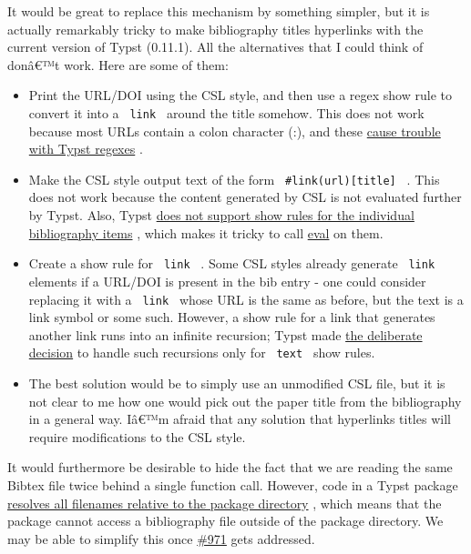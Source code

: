 It would be great to replace this mechanism by something simpler, but it
is actually remarkably tricky to make bibliography titles hyperlinks
with the current version of Typst (0.11.1). All the alternatives that I
could think of donâ€™t work. Here are some of them:

\begin{itemize}
\tightlist
\item
  Print the URL/DOI using the CSL style, and then use a regex show rule
  to convert it into a \texttt{\ link\ } around the title somehow. This
  does not work because most URLs contain a colon character (:), and
  these \href{https://github.com/typst/typst/issues/86}{cause trouble
  with Typst regexes} .
\item
  Make the CSL style output text of the form
  \texttt{\ \#link(url){[}title{]}\ } . This does not work because the
  content generated by CSL is not evaluated further by Typst. Also,
  Typst \href{https://github.com/typst/typst/issues/942}{does not
  support show rules for the individual bibliography items} , which
  makes it tricky to call
  \href{https://typst.app/docs/reference/foundations/eval/}{eval} on
  them.
\item
  Create a show rule for \texttt{\ link\ } . Some CSL styles already
  generate \texttt{\ link\ } elements if a URL/DOI is present in the bib
  entry - one could consider replacing it with a \texttt{\ link\ } whose
  URL is the same as before, but the text is a link symbol or some such.
  However, a show rule for a link that generates another link runs into
  an infinite recursion; Typst made
  \href{https://github.com/typst/typst/pull/3327}{the deliberate
  decision} to handle such recursions only for \texttt{\ text\ } show
  rules.
\item
  The best solution would be to simply use an unmodified CSL file, but
  it is not clear to me how one would pick out the paper title from the
  bibliography in a general way. Iâ€™m afraid that any solution that
  hyperlinks titles will require modifications to the CSL style.
\end{itemize}

It would furthermore be desirable to hide the fact that we are reading
the same Bibtex file twice behind a single function call. However, code
in a Typst package
\href{https://github.com/typst/typst/issues/2126}{resolves all filenames
relative to the package directory} , which means that the package cannot
access a bibliography file outside of the package directory. We may be
able to simplify this once
\href{https://github.com/typst/typst/issues/971}{\#971} gets addressed.

